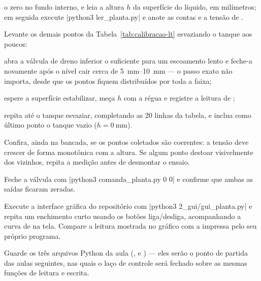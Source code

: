 \begin{roteiro}
    o zero no fundo interno, e leia a altura $h$ da superfície do líquido, em milímetros; em seguida execute
    \cd|python3 ler_planta.py| e anote as contas e a tensão de .
  \item Levante os demais pontos da Tabela~\ref{tab:calibracao-lt} esvaziando o tanque aos poucos:
    \begin{roteiro}
      \item abra a válvula de dreno inferior o suficiente para um escoamento lento e feche-a novamente após
        o nível cair cerca de \qtyrange{5}{10}{\milli\metre} --- o passo exato não importa, desde que os
        pontos fiquem distribuídos por toda a faixa;
      \item espere a superfície estabilizar, meça $h$ com a régua e registre a leitura de ;
      \item repita até o tanque esvaziar, completando as \num{20} linhas da tabela, e inclua como último
        ponto o tanque vazio ($h = \qty{0}{\milli\metre}$).
    \end{roteiro}
  \item Confira, ainda na bancada, se os pontos coletados são coerentes: a tensão deve crescer de forma
    monotônica com a altura. Se algum ponto destoar visivelmente dos vizinhos, repita a medição antes de
    desmontar o ensaio.
  \item Feche a válvula  com \cd|python3 comanda_planta.py 0 0| e confirme que ambas as saídas ficaram
    zeradas.
  \item Execute a interface gráfica do repositório com \cd|python3 2_gui/gui_planta.py| e repita um
    enchimento curto usando os botões liga/desliga, acompanhando a curva de  na tela. Compare a leitura
    mostrada no gráfico com a impressa pelo seu próprio programa.
  \item Guarde os três arquivos Python da aula (,  e
    ) --- eles serão o ponto de partida das aulas seguintes, nas quais o laço de
    controle será fechado sobre as mesmas funções de leitura e escrita.
\end{roteiro}


